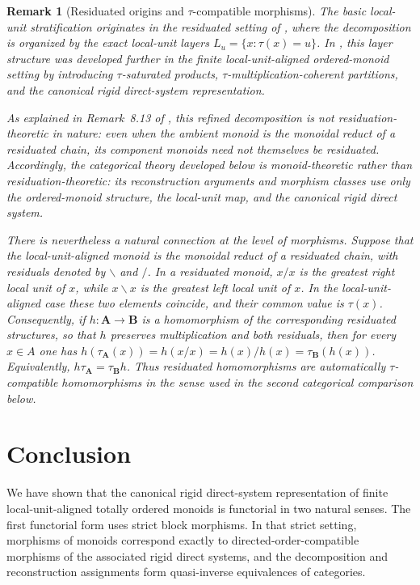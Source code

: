 \documentclass[pdflatex,sn-mathphys-num]{sn-jnl}
\theoremstyle{thmstyleone}%
\theoremstyle{thmstyletwo}%
\newtheorem{remark}[theorem]{Remark}
\theoremstyle{thmstylethree}%
\begin{document}
\begin{remark}[Residuated origins and \texorpdfstring{\(\tau\)}{tau}-compatible morphisms]\label{rem:not-res}
The basic local-unit stratification originates in the residuated setting of \cite{Jenei2022GroupRepr}, where the decomposition is organized by the exact local-unit layers \(L_u=\{x:\tau(x)=u\}\).
In \cite{JeneiLUARepresentation}, this layer structure was developed further in the finite local-unit-aligned ordered-monoid setting by introducing \(\tau\)-saturated products, \(\tau\)-multiplication-coherent partitions, and the canonical rigid direct-system representation.

As explained in Remark~8.13 of \cite{JeneiLUARepresentation}, this refined decomposition is not residuation-theoretic in nature: even when the ambient monoid is the monoidal reduct of a residuated chain, its component monoids need not themselves be residuated.
Accordingly, the categorical theory developed below is monoid-theoretic rather than residuation-theoretic: its reconstruction arguments and morphism classes use only the ordered-monoid structure, the local-unit map, and the canonical rigid direct system.

There is nevertheless a natural connection at the level of morphisms.
Suppose that the local-unit-aligned monoid is the monoidal reduct of a residuated chain, with residuals denoted by \(\backslash\) and \(/\).
In a residuated monoid, \(x/x\) is the greatest right local unit of \(x\), while \(x\backslash x\) is the greatest left local unit of \(x\).
In the local-unit-aligned case these two elements coincide, and their common value is \(\tau(x)\).
Consequently, if \(h\colon \mathbf A\to \mathbf B\) is a homomorphism of the corresponding residuated structures, so that \(h\) preserves multiplication and both residuals, then for every \(x\in A\) one has \(h(\tau_{\mathbf A}(x))=h(x/x)=h(x)/h(x)=\tau_{\mathbf B}(h(x))\).
Equivalently, \(h\tau_{\mathbf A}=\tau_{\mathbf B}h\).
Thus residuated homomorphisms are automatically \(\tau\)-compatible homomorphisms in the sense used in the second categorical comparison below.
\end{remark}

\section*{Conclusion}

We have shown that the canonical rigid direct-system representation of finite local-unit-aligned totally ordered monoids is functorial in two natural senses.
The first functorial form uses strict block morphisms.
In that strict setting, morphisms of monoids correspond exactly to directed-order-compatible morphisms of the associated rigid direct systems, and the decomposition and reconstruction assignments form quasi-inverse equivalences of categories.
\end{document}
